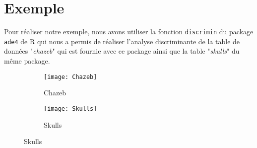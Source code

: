 \documentclass[b]{beamer}
\begin{document}
	\section{Exemple}
	\begin{frame}
		Pour réaliser notre exemple, nous avons utiliser la fonction \texttt{discrimin} du package \texttt{ade4} de R qui nous a permis de réaliser l'analyse discriminante de la table de données "\emph{chazeb}" qui est fournie avec ce package ainsi que la table "\emph{skulls}" du même package.
	\end{frame}
	\begin{frame}
		\begin{figure}[h]
			\begin{subfigure}[b]{0.4\textwidth}
				\texttt{[image: Chazeb]}
				\caption{Chazeb}
			\end{subfigure}
			\begin{subfigure}[b]{0.4\textwidth}
				\texttt{[image: Skulls]}
				\caption{Skulls}
			\end{subfigure}
		\end{figure}
	\end{frame}
\end{document}
